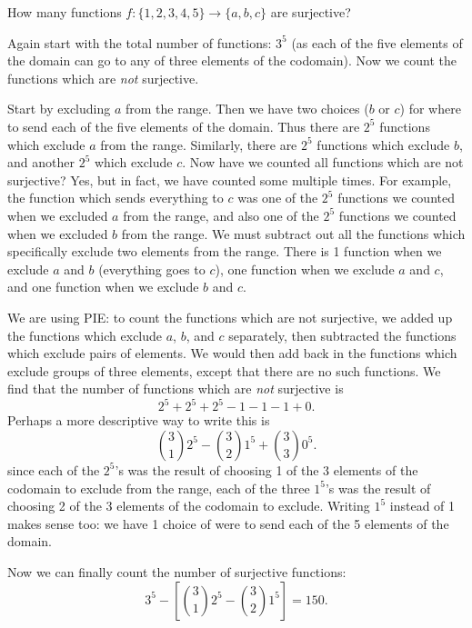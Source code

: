 \documentclass[12pt]{article}
\begin{document}
\begin{example}
  How many functions $f: \{1,2,3,4,5\} \to \{a,b,c\}$ are surjective?
  \begin{solution}
   Again start with the total number of functions: $3^5$ (as each of the five elements of the domain can go to any of three elements of the codomain).  Now we count the functions which are {\em not} surjective.

   Start by excluding $a$ from the range.  Then we have two choices ($b$ or $c$) for where to send each of the five elements of the domain.  Thus there are $2^5$ functions which exclude $a$ from the range.  Similarly, there are $2^5$ functions which exclude $b$, and another $2^5$ which exclude $c$.  Now have we counted all functions which are not surjective?  Yes, but in fact, we have counted some multiple times.  For example, the function which sends everything to $c$ was one of the $2^5$ functions we counted when we excluded $a$ from the range, and also one of the $2^5$ functions we counted when we excluded $b$ from the range.  We must subtract out all the functions which specifically exclude two elements from the range.  There is 1 function when we exclude $a$ and $b$ (everything goes to $c$), one function when we exclude $a$ and $c$, and one function when we exclude $b$ and $c$.

   We are using PIE: to count the functions which are not surjective, we added up the functions which exclude $a$, $b$, and $c$ separately, then subtracted the functions which exclude pairs of elements.  We would then add back in the functions which exclude groups of three elements, except that there are no such functions.  We find that the number of functions which are {\em not} surjective is
   \[2^5 + 2^5 + 2^5 - 1 - 1 - 1 + 0.\]
   Perhaps a more descriptive way to write this is
   \[{3 \choose 1}2^5 - {3 \choose 2}1^5 + {3 \choose 3}0^5.\]
   since each of the $2^5$'s was the result of choosing 1 of the 3 elements of the codomain to exclude from the range, each of the three $1^5$'s was the result of choosing 2 of the 3 elements of the codomain to exclude.  Writing $1^5$ instead of 1 makes sense too: we have 1 choice of were to send each of the 5 elements of the domain.

   Now we can finally count the number of surjective functions:
   \[3^5 - \left[{3 \choose 1}2^5 - {3 \choose 2}1^5\right] = 150.\]
  \end{solution}

\end{example}
\end{document}
